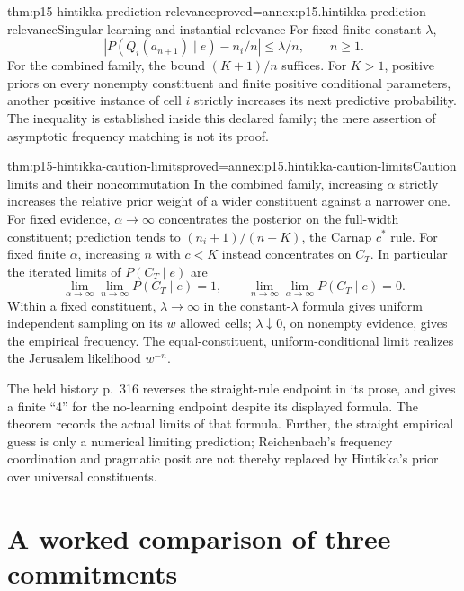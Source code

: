 \begin{hbtheorem}{thm:p15-hintikka-prediction-relevance}{proved=annex:p15.hintikka-prediction-relevance}{Singular learning and instantial relevance}
For fixed finite constant \(\lambda\),
\[
 \left|P(Q_i(a_{n+1})\mid e)-n_i/n\right|\leq\lambda/n,
 \qquad n\geq1.
\]
For the combined family, the bound \((K+1)/n\) suffices.
For \(K>1\), positive priors on every nonempty constituent and
finite positive conditional parameters, another positive instance of
cell \(i\) strictly increases its next predictive probability.
The inequality is established inside this declared family; the mere
assertion of asymptotic frequency matching is not its proof.
\end{hbtheorem}

\begin{hbtheorem}{thm:p15-hintikka-caution-limits}{proved=annex:p15.hintikka-caution-limits}{Caution limits and their noncommutation}
In the combined family, increasing \(\alpha\) strictly increases
the relative prior weight of a wider constituent against a narrower one.
For fixed evidence, \(\alpha\to\infty\) concentrates the posterior
on the full-width constituent; prediction tends to
\((n_i+1)/(n+K)\), the Carnap \(c^*\) rule.
For fixed finite \(\alpha\), increasing \(n\) with \(c<K\)
instead concentrates on \(C_T\). In particular the iterated limits
of \(P(C_T\mid e)\) are
\[
 \lim_{\alpha\to\infty}\lim_{n\to\infty}P(C_T\mid e)=1,
 \qquad
 \lim_{n\to\infty}\lim_{\alpha\to\infty}P(C_T\mid e)=0.
\]
Within a fixed constituent, \(\lambda\to\infty\) in the
constant-\(\lambda\) formula gives uniform independent sampling on
its \(w\) allowed cells; \(\lambda\downarrow0\), on nonempty
evidence, gives the empirical frequency. The equal-constituent,
uniform-conditional limit realizes the Jerusalem likelihood \(w^{-n}\).
\end{hbtheorem}

The held history p.~316 reverses the straight-rule endpoint in its
prose, and gives a finite ``4'' for the no-learning endpoint despite
its displayed formula. The theorem records the actual limits of that
formula. Further, the straight empirical
guess is only a numerical limiting prediction; Reichenbach's
frequency coordination and pragmatic posit are not thereby replaced by
Hintikka's prior over universal constituents.

\section{A worked comparison of three commitments}
\label{sec:p15-hintikka-carnap-reichenbach-comparison}

